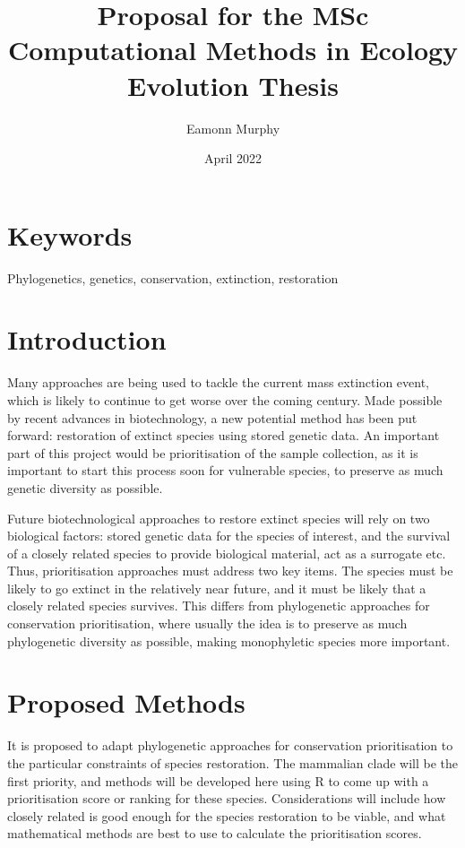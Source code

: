 \documentclass[11pt,titlepage]{article}
\title{Proposal for the MSc Computational Methods in Ecology Evolution Thesis}
\author{Eamonn Murphy}
\date{April 2022}
\begin{document}
	
	\maketitle
	
	\linenumbers
	\section{Keywords}
	
	Phylogenetics, genetics, conservation, extinction, restoration
	
	\section{Introduction}
	Many approaches are being used to tackle the current mass extinction event, which is likely to continue to get worse over the coming century. Made possible by recent advances in biotechnology, a new potential method has been put forward: restoration of extinct species using stored genetic data. An important part of this project would be prioritisation of the sample collection, as it is important to start this process soon for vulnerable species, to preserve as much genetic diversity as possible.
	
	Future biotechnological approaches to restore extinct species will rely on two biological factors: stored genetic data for the species of interest, and the survival of a closely related species to provide biological material, act as a surrogate etc. Thus, prioritisation approaches must address two key items. The species must be likely to go extinct in the relatively near future, and it must be likely that a closely related species survives. This differs from phylogenetic approaches for conservation prioritisation, where usually the idea is to preserve as much phylogenetic diversity as possible, making monophyletic species more important.
	\section{Proposed Methods}
	It is proposed to adapt phylogenetic approaches for conservation prioritisation to the particular constraints of species restoration. The mammalian clade will be the first priority, and methods will be developed here using R to come up with a prioritisation score or ranking for these species. Considerations will include how closely related is good enough for the species restoration to be viable, and what mathematical methods are best to use to calculate the prioritisation scores.
\end{document}
